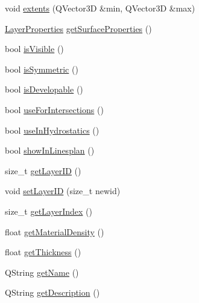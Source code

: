 \begin{DoxyCompactItemize}
\item 
void \hyperlink{classShipCADGeometry_1_1SubdivisionLayer_a2fc3ac326021a97479b821331e295640}{extents} (Q\-Vector3\-D \&min, Q\-Vector3\-D \&max)
\item 
\hyperlink{structShipCADGeometry_1_1LayerProperties}{Layer\-Properties} \hyperlink{classShipCADGeometry_1_1SubdivisionLayer_a7d42f81a94b46f0d999a4fa7a48d57d6}{get\-Surface\-Properties} ()
\item 
bool \hyperlink{classShipCADGeometry_1_1SubdivisionLayer_a6abf8365e77b1ebefbd5d03228efb2b5}{is\-Visible} ()
\item 
bool \hyperlink{classShipCADGeometry_1_1SubdivisionLayer_a48dfa484b555a964db080737cf2c5c0f}{is\-Symmetric} ()
\item 
bool \hyperlink{classShipCADGeometry_1_1SubdivisionLayer_a90a02f5cf0f49f47784e2f52a5283bbd}{is\-Developable} ()
\item 
bool \hyperlink{classShipCADGeometry_1_1SubdivisionLayer_a53e1ee753b64b7f08161e81901d6a7dd}{use\-For\-Intersections} ()
\item 
bool \hyperlink{classShipCADGeometry_1_1SubdivisionLayer_a3bf57aec73dfebdde5a6fb0a7596e2fb}{use\-In\-Hydrostatics} ()
\item 
bool \hyperlink{classShipCADGeometry_1_1SubdivisionLayer_affa6fc5b3ebb056b3e081372623c94c8}{show\-In\-Linesplan} ()
\item 
size\-\_\-t \hyperlink{classShipCADGeometry_1_1SubdivisionLayer_a422af89a2c4e8cdafd264fd54390ea85}{get\-Layer\-I\-D} ()
\item 
void \hyperlink{classShipCADGeometry_1_1SubdivisionLayer_afc09ab43011444cbb373114b7387b880}{set\-Layer\-I\-D} (size\-\_\-t newid)
\item 
size\-\_\-t \hyperlink{classShipCADGeometry_1_1SubdivisionLayer_a9a760dcc67779d111d5e05585e939138}{get\-Layer\-Index} ()
\item 
float \hyperlink{classShipCADGeometry_1_1SubdivisionLayer_aa7c79dd53c5c8c0a6ba3e0e8239013bc}{get\-Material\-Density} ()
\item 
float \hyperlink{classShipCADGeometry_1_1SubdivisionLayer_a824c050d58ae144e1f669ef84ed921be}{get\-Thickness} ()
\item 
Q\-String \hyperlink{classShipCADGeometry_1_1SubdivisionLayer_affb4df074a7f116ce60f51ad7b7ba230}{get\-Name} ()
\item 
Q\-String \hyperlink{classShipCADGeometry_1_1SubdivisionLayer_a0d4f8e0f8f99b18fc6bf5df0554d11ce}{get\-Description} ()
\item 

\end{DoxyCompactItemize}
